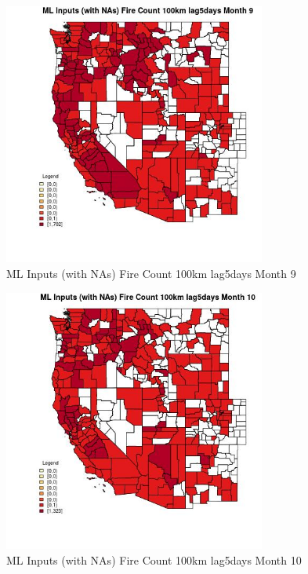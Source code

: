 \begin{figure} 
\centering  
\includegraphics[width=0.77\textwidth]{Code_Outputs/Report_ML_input_PM25_Step4_part_e_de_duplicated_aves_compiled_2019-05-21wNAs_CountyFire_Count_100km_lag5daysmedianMonth9.jpg} 
\caption{\label{fig:Report_ML_input_PM25_Step4_part_e_de_duplicated_aves_compiled_2019-05-21wNAsCountyFire_Count_100km_lag5daysmedianMonth9}ML Inputs (with NAs) Fire Count 100km lag5days Month 9} 
\end{figure} 
 

\begin{figure} 
\centering  
\includegraphics[width=0.77\textwidth]{Code_Outputs/Report_ML_input_PM25_Step4_part_e_de_duplicated_aves_compiled_2019-05-21wNAs_CountyFire_Count_100km_lag5daysmedianMonth10.jpg} 
\caption{\label{fig:Report_ML_input_PM25_Step4_part_e_de_duplicated_aves_compiled_2019-05-21wNAsCountyFire_Count_100km_lag5daysmedianMonth10}ML Inputs (with NAs) Fire Count 100km lag5days Month 10} 
\end{figure} 
 

